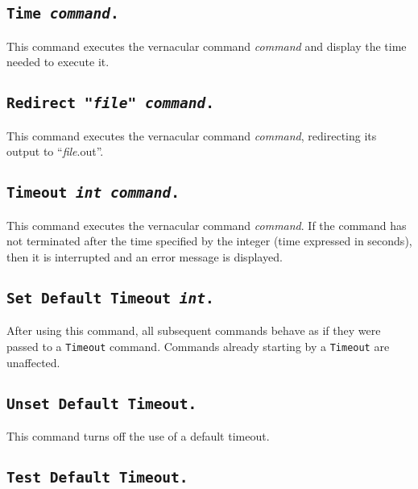 \subsection[\tt Time \textrm{\textsl{command}}.]{\tt Time \textrm{\textsl{command}}.
\label{time}}
This command executes the vernacular command \textrm{\textsl{command}}
and display the time needed to execute it.

\subsection[\tt Redirect "\textrm{\textsl{file}}" \textrm{\textsl{command}}.]{\tt Redirect "\textrm{\textsl{file}}" \textrm{\textsl{command}}.
\label{redirect}}
This command executes the vernacular command \textrm{\textsl{command}}, redirecting its output to ``\textrm{\textsl{file}}.out''.

\subsection[\tt Timeout \textrm{\textsl{int}} \textrm{\textsl{command}}.]{\tt Timeout \textrm{\textsl{int}} \textrm{\textsl{command}}.
\label{timeout}}

This command executes the vernacular command \textrm{\textsl{command}}. If
the command has not terminated after the time specified by the integer
(time expressed in seconds), then it is interrupted and an error message
is displayed.

\subsection[\tt Set Default Timeout \textrm{\textsl{int}}.]{\tt Set
  Default Timeout \textrm{\textsl{int}}.}

After using this command, all subsequent commands behave as if they
were passed to a {\tt Timeout} command. Commands already starting by
a {\tt Timeout} are unaffected.

\subsection[\tt Unset Default Timeout.]{\tt Unset Default Timeout.}

This command turns off the use of a default timeout.

\subsection[\tt Test Default Timeout.]{\tt Test Default Timeout.}

